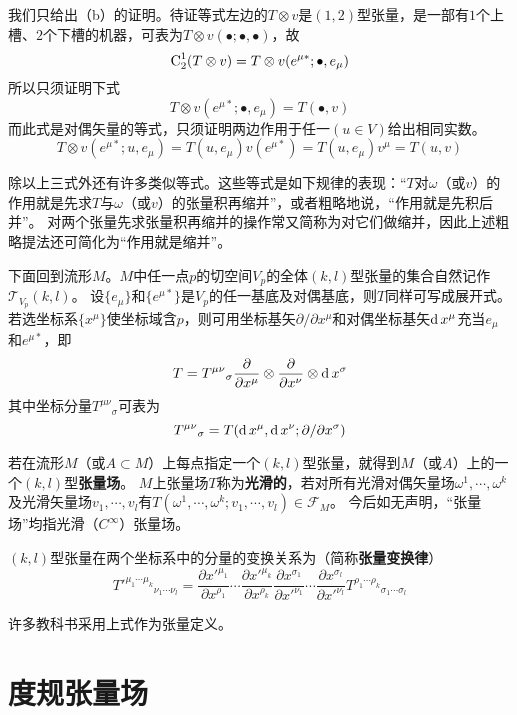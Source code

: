 我们只给出（b）的证明。待证等式左边的$T \otimes v$是$(1, 2)$型张量，是一部有$1$个上槽、$2$个下槽的机器，可表为$T \otimes v(\bullet; \bullet, \bullet)$，故
$$\operatorname{C}^1_2(T \otimes v) = T \otimes v(e^{\mu*}; \bullet, e_\mu)$$
所以只须证明下式
$$T \otimes v(e^{\mu*}; \bullet, e_\mu) = T(\bullet, v)$$
而此式是对偶矢量的等式，只须证明两边作用于任一$(u \in V)$给出相同实数。
$$T \otimes v(e^{\mu*}; u, e_\mu) = T(u, e_\mu)v(e^{\mu*}) = T(u, e_\mu)v^\mu = T(u, v)$$

除以上三式外还有许多类似等式。这些等式是如下规律的表现：``$T$对$\omega$（或$v$）的作用就是先求$T$与$\omega$（或$v$）的张量积再缩并''，或者粗略地说，``作用就是先积后并''。
对两个张量先求张量积再缩并的操作常又简称为对它们做缩并，因此上述粗略提法还可简化为``作用就是缩并''。

下面回到流形$M$。$M$中任一点$p$的切空间$V_p$的全体$(k, l)$型张量的集合自然记作$\mathscr{T}_{V_p}(k, l)$。
设$\{e_\mu\}$和$\{e^{\mu*}\}$是$V_p$的任一基底及对偶基底，则$T$同样可写成展开式。
若选坐标系$\{x^\mu\}$使坐标域含$p$，则可用坐标基矢$\partial / \partial x^\mu$和对偶坐标基矢$\operatorname{d} x^\mu$充当$e_\mu$和$e^{\mu*}$，即
$$T = T^{\mu\nu}{}_\sigma\frac{\partial}{\partial x^\mu}\otimes\frac{\partial}{\partial x^\nu}\otimes\operatorname{d} x^\sigma$$
其中坐标分量$T^{\mu\nu}{}_\sigma$可表为
$$T^{\mu\nu}{}_\sigma = T(\operatorname{d} x^\mu, \operatorname{d} x^\nu; \partial / \partial x^\sigma)$$

若在流形$M$（或$A \subset M$）上每点指定一个$(k, l)$型张量，就得到$M$（或$A$）上的一个$(k, l)$型\textbf{张量场}。
$M$上张量场$T$称为\textbf{光滑的}，若对所有光滑对偶矢量场$\omega^1, \cdots, \omega^k$及光滑矢量场$v_1, \cdots, v_l$有$T(\omega^1, \cdots, \omega^k; v_1, \cdots, v_l) \in \mathscr{F}_M$。
今后如无声明，``张量场''均指光滑（$C^\infty$）张量场。

\begin{theorem}
$(k, l)$型张量在两个坐标系中的分量的变换关系为（简称\textbf{张量变换律}）
$$T'^{\mu_1\cdots\mu_k}{}_{\nu_1\cdots\nu_l} = \frac{\partial x'^{\mu_1}}{\partial x^{\rho_1}}\cdots\frac{\partial x'^{\mu_k}}{\partial x^{\rho_k}}\frac{\partial x^{\sigma_1}}{\partial x'^{\nu_1}}\cdots\frac{\partial x^{\sigma_l}}{\partial x'^{\nu_l}}T^{\rho_1\cdots\rho_k}{}_{\sigma_1\cdots\sigma_l}$$
\end{theorem}

\begin{note}
许多教科书采用上式作为张量定义。
\end{note}

\section{度规张量场}

